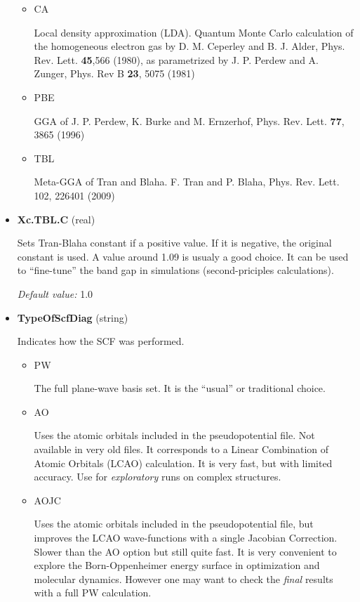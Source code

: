 \documentclass[11pt]{article}
\begin{document}
\begin{itemize}
\begin{itemize}
    \item{CA}

    Local density approximation (LDA). Quantum Monte Carlo
    calculation of the homogeneous
    electron gas by D. M. Ceperley and B. J. Alder,
    Phys. Rev. Lett. \textbf{45},566 (1980), as parametrized by
    J. P. Perdew and A. Zunger, Phys. Rev B \textbf{23}, 5075 (1981)

   \item{PBE}

    GGA of J. P. Perdew, K. Burke and M. Ernzerhof,
    Phys. Rev. Lett. \textbf{77}, 3865 (1996)

   \item{TBL}

   Meta-GGA of Tran and Blaha.
   F. Tran and P. Blaha, Phys. Rev. Lett. 102, 226401 (2009)

  \end{itemize}

\item{\bf Xc.TBL.C} (real)

  Sets Tran-Blaha constant if a positive value.  If it is negative,
  the original constant is used.  A value around 1.09 is usualy a good choice.
  It can be used to ``fine-tune'' the band gap in simulations
  (second-priciples calculations).

  \textit{Default value:}  1.0

\item{\bf TypeOfScfDiag} (string)

  Indicates how the SCF was performed.

  \begin{itemize}

    \item{PW}

    The full plane-wave basis set.  It is the ``usual'' or traditional choice.

    \item{AO}

    Uses the atomic orbitals included in the pseudopotential file.  Not available in very
    old files.  It corresponds to a Linear Combination of Atomic Orbitals (LCAO) calculation.
    It is very fast, but with limited accuracy.  Use for {\it exploratory} runs
    on complex structures.

    \item{AOJC}

    Uses the atomic orbitals included in the pseudopotential file, but improves the LCAO
    wave-functions with a single Jacobian Correction.
    Slower than the AO option but still quite fast.
    It is very convenient to explore
    the Born-Oppenheimer energy surface in optimization and molecular dynamics.
    However one may want to check the {\it final} results with a full PW calculation.


\end{itemize}
\end{itemize}
\end{document}
